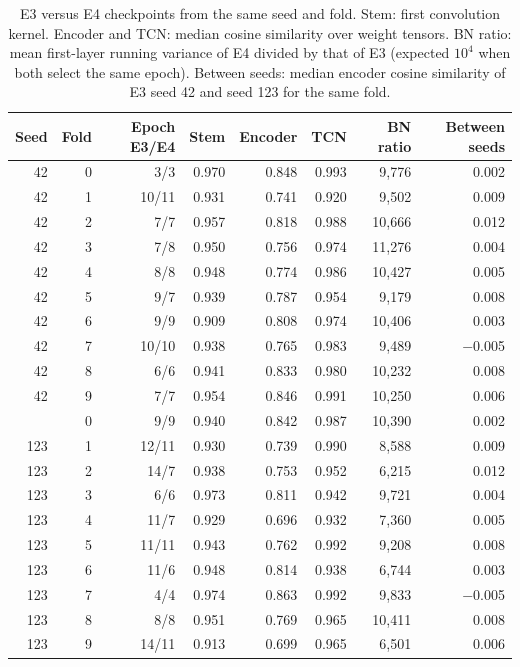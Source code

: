 \documentclass[10pt,a4paper]{article}
\begin{document}
\begin{table}[H]
\centering\small
\caption{E3 versus E4 checkpoints from the same seed and fold. Stem: first convolution kernel. Encoder
and TCN: median cosine similarity over weight tensors. BN ratio: mean first-layer running variance of E4
divided by that of E3 (expected $10^4$ when both select the same epoch). Between seeds: median encoder
cosine similarity of E3 seed 42 and seed 123 for the same fold.}
\label{tab:sup_e3e4}
\begin{tabular}{rrrrrrrr}
\toprule
Seed & Fold & Epoch E3/E4 & Stem & Encoder & TCN & BN ratio & Between seeds \\
\midrule
42 & 0 & 3/3 & 0.970 & 0.848 & 0.993 & 9{,}776 & 0.002 \\
42 & 1 & 10/11 & 0.931 & 0.741 & 0.920 & 9{,}502 & 0.009 \\
42 & 2 & 7/7 & 0.957 & 0.818 & 0.988 & 10{,}666 & 0.012 \\
42 & 3 & 7/8 & 0.950 & 0.756 & 0.974 & 11{,}276 & 0.004 \\
42 & 4 & 8/8 & 0.948 & 0.774 & 0.986 & 10{,}427 & 0.005 \\
42 & 5 & 9/7 & 0.939 & 0.787 & 0.954 & 9{,}179 & 0.008 \\
42 & 6 & 9/9 & 0.909 & 0.808 & 0.974 & 10{,}406 & 0.003 \\
42 & 7 & 10/10 & 0.938 & 0.765 & 0.983 & 9{,}489 & $-$0.005 \\
42 & 8 & 6/6 & 0.941 & 0.833 & 0.980 & 10{,}232 & 0.008 \\
42 & 9 & 7/7 & 0.954 & 0.846 & 0.991 & 10{,}250 & 0.006 \\
\addlinespace
123 & 0 & 9/9 & 0.940 & 0.842 & 0.987 & 10{,}390 & 0.002 \\
123 & 1 & 12/11 & 0.930 & 0.739 & 0.990 & 8{,}588 & 0.009 \\
123 & 2 & 14/7 & 0.938 & 0.753 & 0.952 & 6{,}215 & 0.012 \\
123 & 3 & 6/6 & 0.973 & 0.811 & 0.942 & 9{,}721 & 0.004 \\
123 & 4 & 11/7 & 0.929 & 0.696 & 0.932 & 7{,}360 & 0.005 \\
123 & 5 & 11/11 & 0.943 & 0.762 & 0.992 & 9{,}208 & 0.008 \\
123 & 6 & 11/6 & 0.948 & 0.814 & 0.938 & 6{,}744 & 0.003 \\
123 & 7 & 4/4 & 0.974 & 0.863 & 0.992 & 9{,}833 & $-$0.005 \\
123 & 8 & 8/8 & 0.951 & 0.769 & 0.965 & 10{,}411 & 0.008 \\
123 & 9 & 14/11 & 0.913 & 0.699 & 0.965 & 6{,}501 & 0.006 \\
\bottomrule
\end{tabular}
\end{table}
\end{document}

